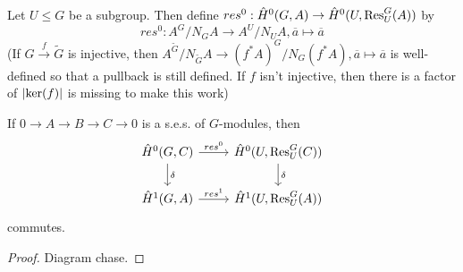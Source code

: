 \documentclass[fontsize=11pt,fleqn,a4paper]{scrartcl}
\begin{document}
\begin{lemmadef}
Let $U\leq G$ be a subgroup. Then define $res^0: \hat{H}^0(G,A) \to \hat{H}^0(U,\operatorname{Res}_U^G(A))$ by
\[res^0:  A^G/N_GA \to A^U/N_UA, \overline{a} \mapsto \overline{a}\]
(If $G\xrightarrow{f}\tilde{G}$ is injective, then $A^{\tilde{G}}/N_{\tilde{G}} A \to (f^\ast A)^G/N_G(f^\ast A), \overline{a} \mapsto \overline{a}$ is well-defined so that a pullback is still defined. If $f$ isn't injective, then there is a factor of $\lvert\ker(f)\rvert$ is missing to make this work)

If $0\to A\to B \to C\to 0$ is a s.e.s. of $G$-modules, then
\[\begin{tikzcd}
\hat{H}^0(G,C) \arrow[r,"res^0"] \arrow[d,"\delta"] & \hat{H}^0(U,\Res_U^G(C)) \arrow[d,"\delta"] \\
\hat{H}^1(G,A) \arrow[r,"res^1"] & \hat{H}^1(U,\Res_U^G(A))
\end{tikzcd}\]
commutes.
\end{lemmadef}
\begin{proof}
Diagram chase.
\end{proof}
\end{document}
